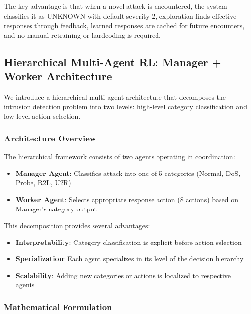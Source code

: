 \documentclass[conference]{IEEEtran}
\begin{document}
The key advantage is that when a novel attack is encountered, the system classifies it as UNKNOWN with default severity 2, exploration finds effective responses through feedback, learned responses are cached for future encounters, and no manual retraining or hardcoding is required.

\subsection{Hierarchical Multi-Agent RL: Manager + Worker Architecture}

We introduce a hierarchical multi-agent architecture that decomposes the intrusion detection problem into two levels: high-level category classification and low-level action selection.

\subsubsection{Architecture Overview}

The hierarchical framework consists of two agents operating in coordination:

\begin{itemize}
    \item \textbf{Manager Agent}: Classifies attack into one of 5 categories (Normal, DoS, Probe, R2L, U2R)
    \item \textbf{Worker Agent}: Selects appropriate response action (8 actions) based on Manager's category output
\end{itemize}

This decomposition provides several advantages:
\begin{itemize}
    \item \textbf{Interpretability}: Category classification is explicit before action selection
    \item \textbf{Specialization}: Each agent specializes in its level of the decision hierarchy
    \item \textbf{Scalability}: Adding new categories or actions is localized to respective agents
\end{itemize}

\subsubsection{Mathematical Formulation}
\end{document}
